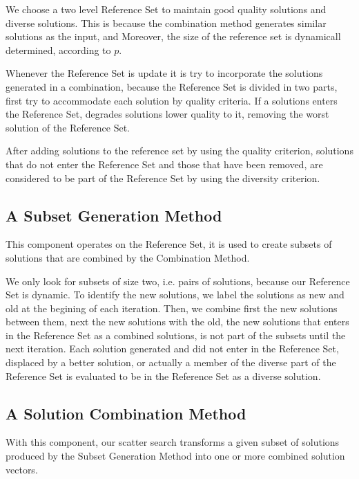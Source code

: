 We choose
a two level Reference Set
to maintain
good quality solutions
and diverse solutions.
This is
because the combination method
generates similar solutions as the input,
and Moreover,
the size of the reference set is dynamicall determined,
according to $p$.

Whenever the Reference Set is update
it is try to incorporate
the solutions generated in a combination,
because the Reference Set is divided
in two parts,
first try to accommodate each solution
by quality criteria.
If a solutions enters the Reference Set,
degrades solutions lower quality to it,
removing the worst solution of the Reference Set.

After adding solutions to the reference set
by using the quality criterion,
solutions that do not enter the Reference Set
and those that have been removed,
are considered to be part
of the Reference Set
by using the diversity criterion.

\subsection{A Subset Generation Method}
This component operates on the Reference Set,
it is used to create subsets
of solutions that are combined
by the Combination Method.

We only look for subsets of size two,
i.e. pairs of solutions,
because our Reference Set is dynamic.
To identify the new solutions,
we label the solutions as new and old
at the begining of each iteration.
Then,
we combine first the new solutions
between them,
next the new solutions with the old,
the new solutions that enters in the Reference Set
as a combined solutions,
is not part of the subsets
until the next iteration.
Each solution generated
and did not enter in the Reference Set,
displaced by a better solution,
or actually
a member of the diverse part of the Reference Set
is evaluated to be in the Reference Set
as a diverse solution.

\subsection{A Solution Combination Method}
With this component,
our scatter search
transforms a given subset of solutions 
produced by the Subset Generation Method
into
one or more combined solution vectors.

